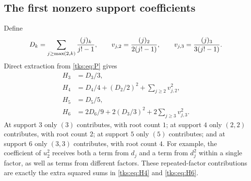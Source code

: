 \subsection{The first nonzero support coefficients}
Define
\begin{equation}\label{tks:eq:Dk}
D_k=\sum_{j\geq\max(2,k)}\frac{(j)_{k}}{j!-1},\qquad
v_{j,2}=\frac{(j)_{2}}{2(j!-1)},\qquad
v_{j,3}=\frac{(j)_{3}}{3(j!-1)}.
\end{equation}
Direct extraction from \eqref{tks:eq:P} gives
\begin{align}
H_3&=D_3/3,\label{tks:eq:H3}\\
H_4&=D_4/4+(D_2/2)^2+\sum_{j\geq2}v_{j,2}^2,\label{tks:eq:H4}\\
H_5&=D_5/5,\label{tks:eq:H5}\\
H_6&=2D_6/9+2(D_3/3)^2+2\sum_{j\geq3}v_{j,3}^2.\label{tks:eq:H6}
\end{align}
At support $3$ only $(3)$ contributes, with root count $1$; at support $4$ only $(2,2)$ contributes, with root count $2$; at support $5$ only $(5)$ contributes; and at support $6$ only $(3,3)$ contributes, with root count $4$. For example, the coefficient of $u_2^2$ receives both a term from $d_j$ and a term from $d_j^2$ within a single factor, as well as terms from different factors. These repeated-factor contributions are exactly the extra squared sums in \eqref{tks:eq:H4} and \eqref{tks:eq:H6}.

